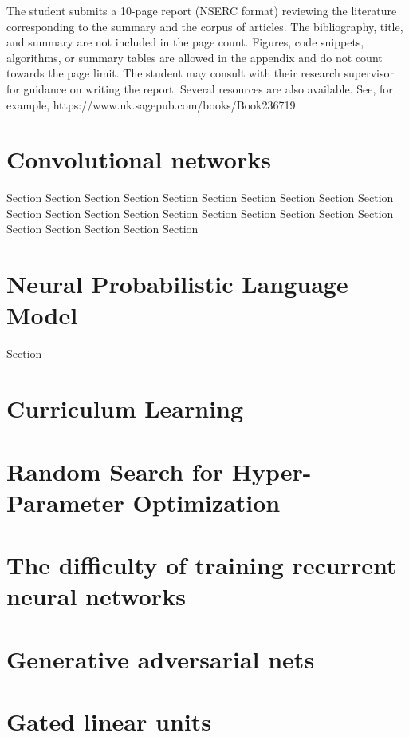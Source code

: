 The student submits a 10-page report (NSERC format) reviewing the literature corresponding to the summary and the corpus of articles. The bibliography, title, and summary are not included in the page count. Figures, code snippets, algorithms, or summary tables are allowed in the appendix and do not count towards the page limit. The student may consult with their research supervisor for guidance on writing the report. Several resources are also available. See, for example, https://www.uk.sagepub.com/books/Book236719

\section{Convolutional networks \cite{LeCun1998GradientbasedLA}}

Section Section Section Section Section Section Section Section Section Section Section Section Section Section Section Section Section Section Section Section Section Section Section Section Section 

\section{Neural Probabilistic Language Model \cite{Bengio2003ANP}}

Section

\section{Curriculum Learning \cite{Bengio2009CurriculumL}}

\section{Random Search for Hyper-Parameter Optimization \cite{Bergstra2012RandomSF}}

\section{The difficulty of training recurrent neural networks \cite{Pascanu2012OnTD}}

\section{Generative adversarial nets \cite{goodfellow2014generative}}

\section{Gated linear units \cite{Cho2014LearningPR}}

